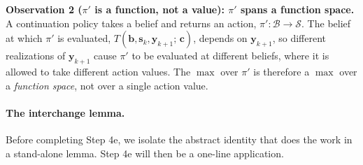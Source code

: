 \documentclass[11pt]{article}
\newcommand{\bc}{\bm{c}}
\newcommand{\by}{\bm{y}}
\newcommand{\bs}{\bm{s}}
\newcommand{\bb}{\bm{b}}
\begin{document}
\textbf{Observation 2 ($\pi'$ is a function, not a value): $\pi'$ spans a function space.}  A continuation policy takes a belief and returns an action, $\pi' : \mathcal{B} \to \mathcal{S}$.  The belief at which $\pi'$ is evaluated, $T(\bb, \bs_k, \by_{k+1};\, \bc)$, depends on $\by_{k+1}$, so different realizations of $\by_{k+1}$ cause $\pi'$ to be evaluated at different beliefs, where it is allowed to take different action values.  The $\max$ over $\pi'$ is therefore a $\max$ over a \emph{function space}, not over a single action value.

\paragraph{The interchange lemma.}  Before completing Step 4e, we isolate the abstract identity that does the work in a stand-alone lemma.  Step 4e will then be a one-line application.
\end{document}
